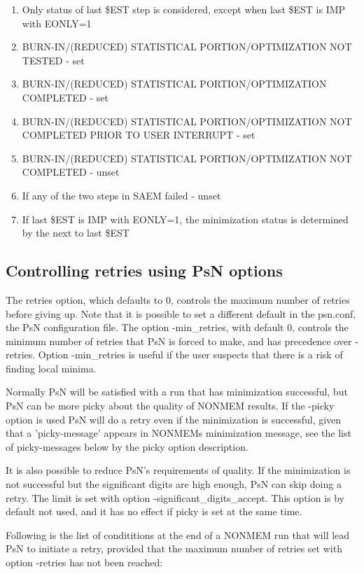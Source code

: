 \begin{enumerate}
\item Only status of last \$EST step is considered, except when last \$EST is IMP with EONLY=1
\item BURN-IN/(REDUCED) STATISTICAL PORTION/OPTIMIZATION NOT TESTED - set
\item BURN-IN/(REDUCED) STATISTICAL PORTION/OPTIMIZATION COMPLETED -  set
\item BURN-IN/(REDUCED) STATISTICAL PORTION/OPTIMIZATION NOT COMPLETED PRIOR TO USER INTERRUPT - set
\item BURN-IN/(REDUCED) STATISTICAL PORTION/OPTIMIZATION NOT COMPLETED - unset
\item If any of the two steps in SAEM failed - unset 
\item If last \$EST is IMP with EONLY=1, the minimization status is determined by the next to last \$EST
\end{enumerate}

\subsection{Controlling retries using PsN options}
The retries option, which defaults to 0, controls the maximum number of retries before giving up. Note that it is possible to set a different default in the psn.conf, the PsN configuration file. The option -min\_retries, with default 0, controls the minimum number of retries that PsN is forced to make, and has precedence over -retries. Option -min\_retries is useful if the user suspects that there is a risk of finding local minima.

Normally PsN will be satisfied with a run that has minimization successful, but PsN can be more picky about the quality of NONMEM results. If the -picky option is used PsN will do a retry even if the minimization is successful, given that a 'picky-message' appears in NONMEMs minimization message, see the list of picky-messages below by the picky option description.

It is also possible to reduce PsN's requirements of quality. If the minimization is not successful but the significant digits are high enough, PsN can skip doing a retry. The limit is set with option -significant\_digits\_accept. This option is by default not used, and it has no effect if picky is set at the same time.

Following is the list of condititions at the end of a NONMEM run that will lead PsN to initiate a retry, provided that the maximum number of retries set with option -retries has not been reached:

